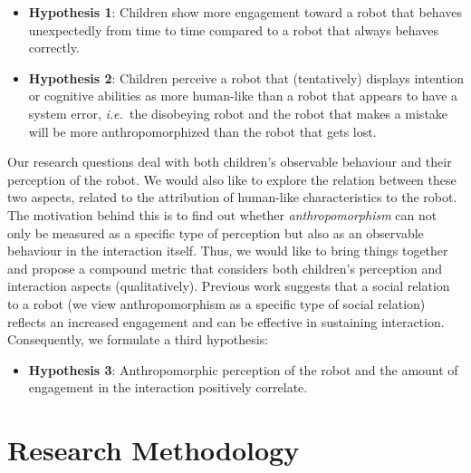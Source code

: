 \documentclass[letterpaper, 10pt, conference]{ieeeconf}
\newcommand{\ie}{{\textit{i.e.~}}}
\begin{document}
\begin{itemize}

    \item {\bf Hypothesis 1}: Children show more engagement toward a robot that
        behaves unexpectedly from time to time compared to a robot that always
        behaves correctly.

    \item {\bf Hypothesis 2}: Children perceive a robot that (tentatively) displays
        intention or cognitive abilities as more human-like than a robot that
        appears to have a system error, \ie the disobeying robot and the robot
        that makes a mistake will be more anthropomorphized than the robot that
        gets lost.

\end{itemize}

Our research questions deal with both children's observable behaviour and their
perception of the robot. We would also like to explore the relation between
these two aspects, related to the attribution of human-like characteristics to
the robot. The motivation behind this is to find out whether
\textit{anthropomorphism} can not only be measured as a specific type of
perception but also as an observable behaviour in the interaction itself. Thus,
we would like to bring things together and propose a compound metric that
considers both children's perception and interaction aspects (qualitatively).
Previous work suggests that a social relation to a robot (we view
anthropomorphism as a specific type of social relation) reflects an increased
engagement and can be effective in sustaining interaction.  Consequently, we
formulate a third hypothesis:

\begin{itemize}

\item {\bf Hypothesis 3}: Anthropomorphic perception of the robot and the amount
    of engagement in the interaction positively correlate.

\end{itemize}



\section{Research Methodology}
\end{document}
